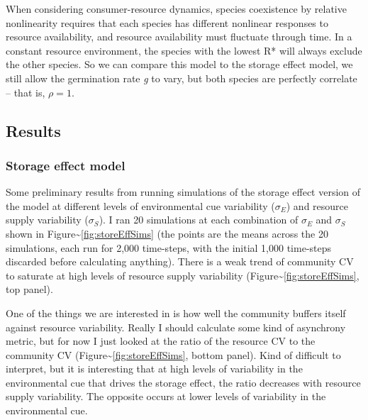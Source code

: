 \documentclass[12pt,]{article}
\begin{document}
When considering consumer-resource dynamics, species coexistence by
relative nonlinearity requires that each species has different nonlinear
responses to resource availability, and resource availability must
fluctuate through time. In a constant resource environment, the species
with the lowest R* will always exclude the other species. So we can
compare this model to the storage effect model, we still allow the
germination rate \emph{g} to vary, but both species are perfectly
correlate -- that is, $\rho=1$.

\subsection{Results}\label{results}

\subsubsection{Storage effect model}\label{storage-effect-model}

Some preliminary results from running simulations of the storage effect
version of the model at different levels of environmental cue
variability ($\sigma_{E}$) and resource supply variability
($\sigma_{S}$). I ran 20 simulations at each combination of $\sigma_{E}$
and $\sigma_{S}$ shown in Figure\textasciitilde{}\ref{fig:storeEffSims}
(the points are the means across the 20 simulations, each run for 2,000
time-steps, with the initial 1,000 time-steps discarded before
calculating anything). There is a weak trend of community CV to saturate
at high levels of resource supply variability
(Figure\textasciitilde{}\ref{fig:storeEffSims}, top panel).

One of the things we are interested in is how well the community buffers
itself against resource variability. Really I should calculate some kind
of asynchrony metric, but for now I just looked at the ratio of the
resource CV to the community CV
(Figure\textasciitilde{}\ref{fig:storeEffSims}, bottom panel). Kind of
difficult to interpret, but it is interesting that at high levels of
variability in the environmental cue that drives the storage effect, the
ratio decreases with resource supply variability. The opposite occurs at
lower levels of variability in the environmental cue.
\end{document}
